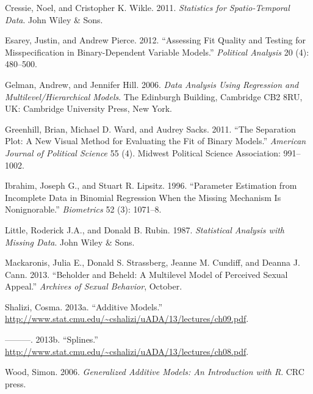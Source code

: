\documentclass[12pt,twoside]{reedthesis}
\begin{document}
  \hypertarget{refs}{}
  \hypertarget{ref-cressie2011}{}
  Cressie, Noel, and Cristopher K. Wikle. 2011. \emph{Statistics for
  Spatio-Temporal Data}. John Wiley \& Sons.
  
  \hypertarget{ref-esarey2012}{}
  Esarey, Justin, and Andrew Pierce. 2012. ``Assessing Fit Quality and
  Testing for Misspecification in Binary-Dependent Variable Models.''
  \emph{Political Analysis} 20 (4): 480--500.
  
  \hypertarget{ref-gelman}{}
  Gelman, Andrew, and Jennifer Hill. 2006. \emph{Data Analysis Using
  Regression and Multilevel/Hierarchical Models}. The Edinburgh Building,
  Cambridge CB2 8RU, UK: Cambridge University Press, New York.
  
  \hypertarget{ref-greenhill2011}{}
  Greenhill, Brian, Michael D. Ward, and Audrey Sacks. 2011. ``The
  Separation Plot: A New Visual Method for Evaluating the Fit of Binary
  Models.'' \emph{American Journal of Political Science} 55 (4). Midwest
  Political Science Association: 991--1002.
  
  \hypertarget{ref-ibrahim1996}{}
  Ibrahim, Joseph G., and Stuart R. Lipsitz. 1996. ``Parameter Estimation
  from Incomplete Data in Binomial Regression When the Missing Mechanism
  Is Nonignorable.'' \emph{Biometrics} 52 (3): 1071--8.
  
  \hypertarget{ref-little1987}{}
  Little, Roderick J.A., and Donald B. Rubin. 1987. \emph{Statistical
  Analysis with Missing Data}. John Wiley \& Sons.
  
  \hypertarget{ref-mackaronis2013}{}
  Mackaronis, Julia E., Donald S. Strassberg, Jeanne M. Cundiff, and
  Deanna J. Cann. 2013. ``Beholder and Beheld: A Multilevel Model of
  Perceived Sexual Appeal.'' \emph{Archives of Sexual Behavior}, October.
  
  \hypertarget{ref-cosmaadditive}{}
  Shalizi, Cosma. 2013a. ``Additive Models.''
  \url{http://www.stat.cmu.edu/~cshalizi/uADA/13/lectures/ch09.pdf}.
  
  \hypertarget{ref-cosmasplines}{}
  ---------. 2013b. ``Splines.''
  \url{http://www.stat.cmu.edu/~cshalizi/uADA/13/lectures/ch08.pdf}.
  
  \hypertarget{ref-wood2006}{}
  Wood, Simon. 2006. \emph{Generalized Additive Models: An Introduction
  with R}. CRC press.


\end{document}
